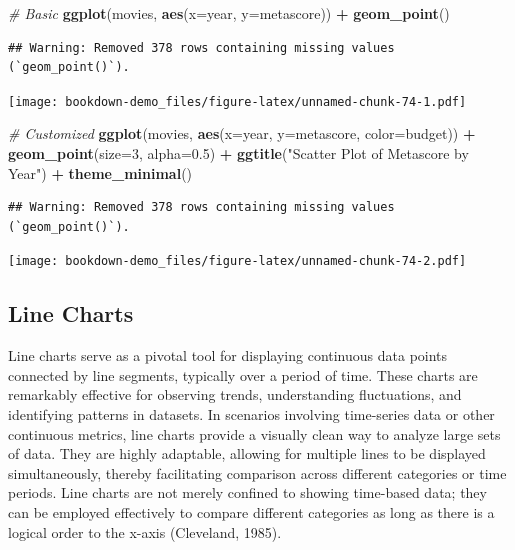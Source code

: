 \documentclass[
  b5paper]{book}
\newenvironment{Shaded}{\begin{snugshade}}{\end{snugshade}}
\newcommand{\AttributeTok}[1]{\textcolor[rgb]{0.13,0.29,0.53}{#1}}
\newcommand{\CommentTok}[1]{\textcolor[rgb]{0.56,0.35,0.01}{\textit{#1}}}
\newcommand{\DecValTok}[1]{\textcolor[rgb]{0.00,0.00,0.81}{#1}}
\newcommand{\FloatTok}[1]{\textcolor[rgb]{0.00,0.00,0.81}{#1}}
\newcommand{\FunctionTok}[1]{\textcolor[rgb]{0.13,0.29,0.53}{\textbf{#1}}}
\newcommand{\NormalTok}[1]{#1}
\newcommand{\SpecialCharTok}[1]{\textcolor[rgb]{0.81,0.36,0.00}{\textbf{#1}}}
\newcommand{\StringTok}[1]{\textcolor[rgb]{0.31,0.60,0.02}{#1}}
\begin{document}
\begin{Shaded}
\begin{Highlighting}[]
\CommentTok{\# Basic}
\FunctionTok{ggplot}\NormalTok{(movies, }\FunctionTok{aes}\NormalTok{(}\AttributeTok{x=}\NormalTok{year, }\AttributeTok{y=}\NormalTok{metascore)) }\SpecialCharTok{+} \FunctionTok{geom\_point}\NormalTok{()}
\end{Highlighting}
\end{Shaded}

\begin{verbatim}
## Warning: Removed 378 rows containing missing values (`geom_point()`).
\end{verbatim}

\texttt{[image: bookdown-demo\_files/figure-latex/unnamed-chunk-74-1.pdf]}

\begin{Shaded}
\begin{Highlighting}[]
\CommentTok{\# Customized}
\FunctionTok{ggplot}\NormalTok{(movies, }\FunctionTok{aes}\NormalTok{(}\AttributeTok{x=}\NormalTok{year, }\AttributeTok{y=}\NormalTok{metascore, }\AttributeTok{color=}\NormalTok{budget)) }\SpecialCharTok{+} 
  \FunctionTok{geom\_point}\NormalTok{(}\AttributeTok{size=}\DecValTok{3}\NormalTok{, }\AttributeTok{alpha=}\FloatTok{0.5}\NormalTok{) }\SpecialCharTok{+}
  \FunctionTok{ggtitle}\NormalTok{(}\StringTok{"Scatter Plot of Metascore by Year"}\NormalTok{) }\SpecialCharTok{+}
  \FunctionTok{theme\_minimal}\NormalTok{()}
\end{Highlighting}
\end{Shaded}

\begin{verbatim}
## Warning: Removed 378 rows containing missing values (`geom_point()`).
\end{verbatim}

\texttt{[image: bookdown-demo\_files/figure-latex/unnamed-chunk-74-2.pdf]}

\hypertarget{line-charts}{%
\subsection*{Line Charts}\label{line-charts}}

Line charts serve as a pivotal tool for displaying continuous data points connected by line segments, typically over a period of time. These charts are remarkably effective for observing trends, understanding fluctuations, and identifying patterns in datasets. In scenarios involving time-series data or other continuous metrics, line charts provide a visually clean way to analyze large sets of data. They are highly adaptable, allowing for multiple lines to be displayed simultaneously, thereby facilitating comparison across different categories or time periods. Line charts are not merely confined to showing time-based data; they can be employed effectively to compare different categories as long as there is a logical order to the x-axis (Cleveland, 1985).
\end{document}
